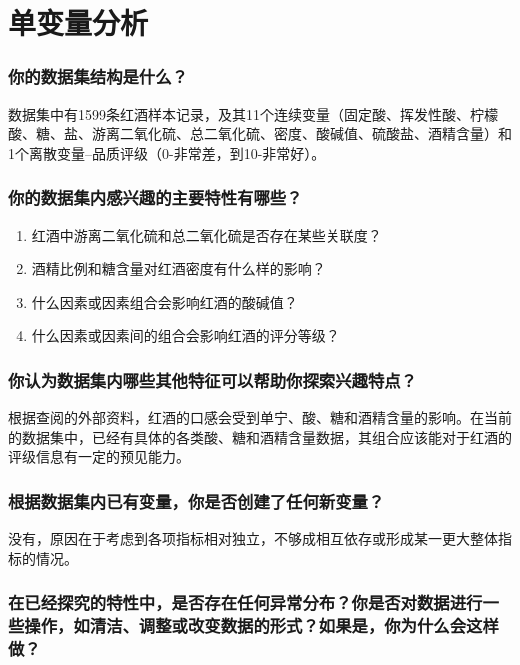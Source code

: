 \documentclass[]{article}
\providecommand{\tightlist}{%
  \setlength{\itemsep}{0pt}\setlength{\parskip}{0pt}}
\begin{document}
\section{单变量分析}

\subsubsection{你的数据集结构是什么？}

数据集中有1599条红酒样本记录，及其11个连续变量（固定酸、挥发性酸、柠檬酸、糖、盐、游离二氧化硫、总二氧化硫、密度、酸碱值、硫酸盐、酒精含量）和1个离散变量--品质评级（0-非常差，到10-非常好）。

\subsubsection{你的数据集内感兴趣的主要特性有哪些？}

\begin{enumerate}
\def\labelenumi{\arabic{enumi}.}
\tightlist
\item
  红酒中游离二氧化硫和总二氧化硫是否存在某些关联度？
\item
  酒精比例和糖含量对红酒密度有什么样的影响？
\item
  什么因素或因素组合会影响红酒的酸碱值？
\item
  什么因素或因素间的组合会影响红酒的评分等级？
\end{enumerate}

\subsubsection{你认为数据集内哪些其他特征可以帮助你探索兴趣特点？}

根据查阅的外部资料，红酒的口感会受到单宁、酸、糖和酒精含量的影响。在当前的数据集中，已经有具体的各类酸、糖和酒精含量数据，其组合应该能对于红酒的评级信息有一定的预见能力。

\subsubsection{根据数据集内已有变量，你是否创建了任何新变量？}

没有，原因在于考虑到各项指标相对独立，不够成相互依存或形成某一更大整体指标的情况。

\subsubsection{在已经探究的特性中，是否存在任何异常分布？你是否对数据进行一些操作，如清洁、调整或改变数据的形式？如果是，你为什么会这样做？}
\end{document}

